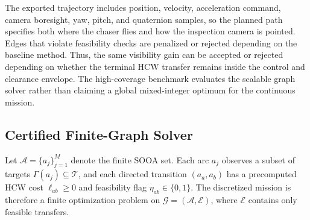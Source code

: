 The exported trajectory includes position, velocity, acceleration command,
camera boresight, yaw, pitch, and quaternion samples, so the planned path
specifies both where the chaser flies and how the inspection camera is
pointed. Edges that violate feasibility checks are penalized or rejected
depending on the baseline method. Thus, the same visibility gain can be
accepted or rejected depending on whether the terminal HCW transfer remains
inside the control and clearance envelope. The high-coverage benchmark
evaluates the scalable graph solver rather than claiming a global
mixed-integer optimum for the continuous mission.



\subsection{Certified Finite-Graph Solver}
\label{sec:theory}

Let $\mathcal A=\{a_j\}_{j=1}^{M}$ denote the finite SOOA set. Each arc $a_j$
observes a subset of targets $\Gamma(a_j) \subseteq \mathcal T$, and each
directed transition $(a_a,a_b)$ has a precomputed HCW cost
$\ell_{ab}\ge 0$ and feasibility flag $\eta_{ab}\in\{0,1\}$. The discretized
mission is therefore a finite optimization problem on
$\mathcal G=(\mathcal A,\mathcal E)$, where $\mathcal E$ contains only
feasible transfers.

